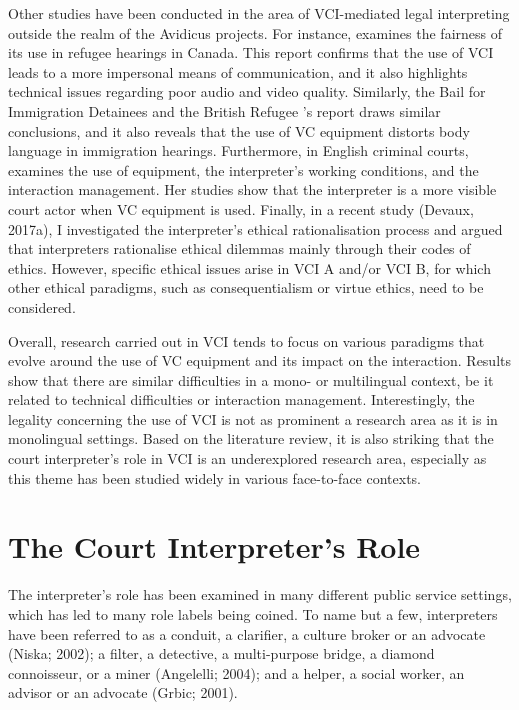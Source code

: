 \documentclass[output=paper]{langsci/langscibook}
\begin{document}
Other studies have been conducted in the area of VCI-mediated legal interpreting outside the realm of the Avidicus projects. For instance, \citet{Ellis2004} examines the fairness of its use in refugee hearings in Canada. This report confirms that the use of VCI leads to a more impersonal means of communication, and it also highlights technical issues regarding poor audio and video quality. Similarly, the Bail for Immigration Detainees and the British Refugee \citet{Council2008}’s report draws similar conclusions, and it also reveals that the use of VC equipment distorts body language in immigration hearings. Furthermore, in English criminal courts, \citet{Fowler2012} examines the use of equipment, the interpreter’s working conditions, and the interaction management. Her studies show that the interpreter is a more visible court actor when VC equipment is used. Finally, in a recent study (Devaux, 2017a), I investigated the interpreter’s ethical rationalisation process and argued that interpreters rationalise ethical dilemmas mainly through their codes of ethics. However, specific ethical issues arise in VCI A and/or VCI B, for which other ethical paradigms, such as consequentialism or virtue ethics, need to be considered. 

Overall, research carried out in VCI tends to focus on various paradigms that evolve around the use of VC equipment and its impact on the interaction. Results show that there are similar difficulties in a mono- or multilingual context, be it related to technical difficulties or interaction management. Interestingly, the legality concerning the use of VCI is not as prominent a research area as it is in monolingual settings. Based on the literature review, it is also striking that the court interpreter’s role in VCI is an underexplored research area, especially as this theme has been studied widely in various face-to-face contexts. 

\section{The Court Interpreter’s Role}

The interpreter’s role has been examined in many different public service settings, which has led to many role labels being coined. To name but a few, interpreters have been referred to as a conduit, a clarifier, a culture broker or an advocate (Niska; 2002); a filter, a detective, a multi-purpose bridge, a diamond connoisseur, or a miner (Angelelli; 2004); and a helper, a social worker, an advisor or an advocate (Grbic; 2001).
\end{document}
